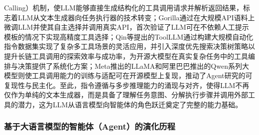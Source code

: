 Calling）机制，使LLM能够直接生成结构化的工具调用请求并解析返回结果，标志着LLM从文本生成器向任务执行器的技术转变；Gorilla\cite{patil2024gorilla}通过在大规模API语料上微调LLM并使其自主选择并调用真实API，首次验证了LLM可在不依赖人工提示模板的情况下实现高精度工具选择；Qin等\cite{qin2024toolllm}提出的ToolLLM通过构建大规模自动化指令数据集实现了复杂多工具场景的灵活应用，并引入深度优先搜索决策树策略以提升长链工具调用的探索效率与成功率，为开源大模型在真实复杂任务中的工具编排与决策提供了系统化方案；Meta推出的LLaMA\cite{touvron2023llama}和阿里巴巴推出的Qwen\cite{yang2025qwen3technicalreport}系列大模型则使工具调用能力的训练与适配可在开源模型上复现，推动了Agent研究的可复现性与民主化。至此，指令遵循与多步推理能力的涌现与对齐，使得LLM不再仅作为单纯的文本生成器，而是具备了理解任务意图、分解执行步骤并调用外部工具的潜力，这为LLM从语言模型向智能体的角色跃迁奠定了完整的能力基础。

\subsubsection{基于大语言模型的智能体（Agent）的演化历程}

